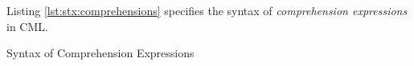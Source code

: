 Listing \ref{lst:stx:comprehensions} specifies the syntax of
\emph{comprehension expressions} in CML.

\begin{code}[H]
\verbatimfont{\small}

\caption{Syntax of Comprehension Expressions}
\label{lst:stx:comprehensions}
\end{code}
